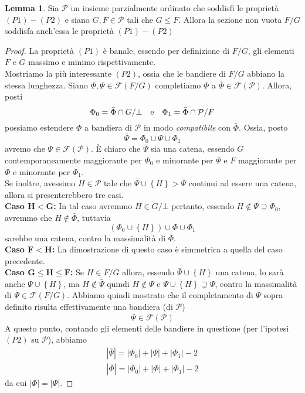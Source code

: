 \documentclass[a4paper,12pt]{report}
\newcommand{\p}{\mathcal{P}}
\theoremstyle{plain}
\theoremstyle{definition}
\newtheorem{lem}[teo]{Lemma}
\begin{document}
\begin{lem}
\label{P1P2Sections}
Sia $\p$ un insieme parzialmente ordinato che soddisfi le propriet\`a $(P1)-(P2)$ e siano $G,F\in\p$ tali che $G\leq F$. Allora la sezione non vuota
$F/G$ soddisfa anch'essa le propriet\`a $(P1)-(P2)$
\end{lem}
\begin{proof}
La propriet\`a $(P1)$ \`e banale, essendo per definizione di $F/G$, gli elementi $F$ e $G$ massimo e minimo rispettivamente.\\
Mostriamo la pi\`u interessante $(P2)$, ossia che le bandiere di $F/G$ abbiano la stessa lunghezza. Siano $\Phi,\Psi\in\mathcal{F}(F/G)$
completiamo $\Phi$ a $\bar{\Phi}\in\mathcal{F}(\p)$. Allora, posti
\begin{equation*}
\Phi_0=\bar{\Phi}\cap G/\bot\text{\quad e\quad }\Phi_1=\bar{\Phi}\cap\p/F
\end{equation*}
possiamo estendere $\Phi$ a bandiera di $\p$ in modo \emph{compatibile} con $\bar{\Phi}$. Ossia, posto
\begin{equation*}
\bar{\Psi}=\Phi_0\cup\Psi\cup\Phi_1
\end{equation*}
avremo che $\bar{\Psi}\in\mathcal{F}(\p)$. \`E chiaro che $\bar{\Psi}$ sia una catena, essendo $G$ contemporaneamente maggiorante per $\Phi_0$ e
minorante per $\Psi$ e $F$ maggiorante per $\Phi$ e minorante per $\Phi_1$.\\
Se inoltre, avessimo $H\in\p$ tale che $\bar{\Psi}\cup\left\{H\right\}>\bar{\Psi}$ continui ad essere una catena, allora si presenterebbero tre casi.\\
\textbf{Caso $\bm{H<G}$:}
In tal caso avremmo $H\in G/\bot$ pertanto, essendo $H\notin\Psi\supseteq\Phi_0$, avremmo che $H\notin\bar{\Phi}$, tuttavia
\begin{equation*}
\left(\Phi_0\cup\left\{H\right\}\right)\cup\Phi\cup\Phi_1
\end{equation*}
sarebbe una catena, contro la massimalit\`a di $\bar{\Phi}$.\\
\textbf{Caso $\bm{F<H}$:}
La dimostrazione di questo caso \`e simmetrica a quella del caso precedente.\\
\textbf{Caso $\bm{G\leq H\leq F}$:}
Se $H\in F/G$ allora, essendo $\bar{\Psi}\cup\left\{H\right\}$ una catena, lo sar\`a anche $\Psi\cup\left\{H\right\}$, ma
$H\notin\bar{\Psi}$ quindi $H\notin\Psi$ e $\Psi\cup\left\{H\right\}\supsetneq\Psi$, contro la massimalit\`a di $\Psi\in\mathcal{F}(F/G)$.
Abbiamo quindi mostrato che il completamento di $\Psi$ sopra definito risulta effettivamente una bandiera (di $\p$)
\begin{equation*}
\bar{\Psi}\in\mathcal{F}(\p)
\end{equation*}
A questo punto, contando gli elementi delle bandiere in questione (per l'ipotesi $(P2)$ su $\p$), abbiamo
\begin{gather*}
\left|\bar{\Psi}\right|=|\Phi_0|+|\Psi|+|\Phi_1|-2\\
|\bar{\Phi}|=|\Phi_0|+|\Phi|+|\Phi_1|-2
\end{gather*}
da cui $|\Phi|=|\Psi|$.
\end{proof}
\end{document}
